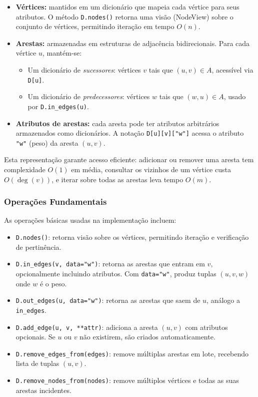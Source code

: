 \begin{itemize}\setlength{\itemsep}{2pt}
    \item \textbf{Vértices:} mantidos em um dicionário que mapeia cada vértice para seus atributos. O método \texttt{D.nodes()} retorna uma visão (NodeView) sobre o conjunto de vértices, permitindo iteração em tempo \(O(n)\).
    \item \textbf{Arestas:} armazenadas em estruturas de adjacência bidirecionais. Para cada vértice \(u\), mantém-se:
          \begin{itemize}\setlength{\itemsep}{2pt}
              \item Um dicionário de \emph{sucessores}: vértices \(v\) tais que \((u,v)\in A\), acessível via \texttt{D[u]}.
              \item Um dicionário de \emph{predecessores}: vértices \(w\) tais que \((w,u)\in A\), usado por \texttt{D.in\_edges(u)}.
          \end{itemize}
    \item \textbf{Atributos de arestas:} cada aresta pode ter atributos arbitrários armazenados como dicionários. A notação \texttt{D[u][v]["w"]} acessa o atributo \texttt{"w"} (peso) da aresta \((u,v)\).
\end{itemize}

Esta representação garante acesso eficiente: adicionar ou remover uma aresta tem complexidade \(O(1)\) em média, consultar os vizinhos de um vértice custa \(O(\deg(v))\), e iterar sobre todas as arestas leva tempo \(O(m)\).

\subsubsection{Operações Fundamentais}

As operações básicas usadas na implementação incluem:

\begin{itemize}\setlength{\itemsep}{2pt}
    \item \texttt{D.nodes()}: retorna visão sobre os vértices, permitindo iteração e verificação de pertinência.
    \item \texttt{D.in\_edges(v, data="w")}: retorna as arestas que entram em \(v\), opcionalmente incluindo atributos. Com \texttt{data="w"}, produz tuplas \((u, v, w)\) onde \(w\) é o peso.
    \item \texttt{D.out\_edges(u, data="w")}: retorna as arestas que saem de \(u\), análogo a \texttt{in\_edges}.
    \item \texttt{D.add\_edge(u, v, **attr)}: adiciona a aresta \((u,v)\) com atributos opcionais. Se \(u\) ou \(v\) não existirem, são criados automaticamente.
    \item \texttt{D.remove\_edges\_from(edges)}: remove múltiplas arestas em lote, recebendo lista de tuplas \((u,v)\).
    \item \texttt{D.remove\_nodes\_from(nodes)}: remove múltiplos vértices e todas as suas arestas incidentes.
\end{itemize}

